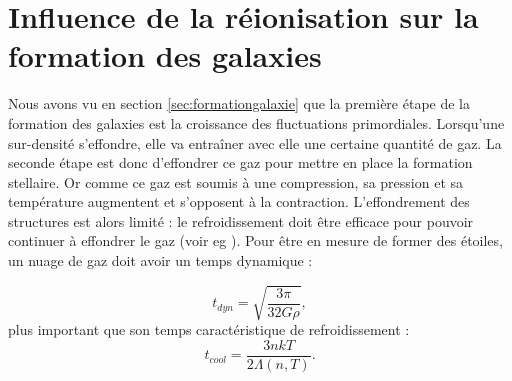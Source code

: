 

\section{Influence de la réionisation sur la formation des galaxies}
\label{sec:refroidissement}

Nous avons vu en section \ref{sec:formationgalaxie} que la première étape de la formation des galaxies est la croissance des fluctuations primordiales.
Lorsqu'une sur-densité s’effondre, elle va entraîner avec elle une certaine quantité de gaz.
La seconde étape est donc d’effondrer ce gaz pour mettre en place la formation stellaire.
Or comme ce gaz est soumis à une compression, sa pression et sa température augmentent et s'opposent à la contraction.
L'effondrement des structures est alors limité : le refroidissement doit être efficace pour pouvoir continuer à effondrer le gaz (voir eg \cite{2004ARA&A..42...79B}).
Pour être en mesure de former des étoiles, un nuage de gaz doit avoir un temps dynamique :

\begin{equation}
t_{dyn} =\sqrt{\frac{3 \pi}{32 G \rho}},
\end{equation}
plus important que son temps caractéristique de refroidissement :
\begin{equation}
t_{cool} = \frac{3 nkT}{2 \Lambda(n,T)}.
\end{equation}


